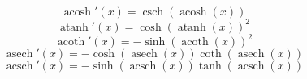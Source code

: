 \documentclass{article}
\DeclareMathOperator{\csch}{csch}
\DeclareMathOperator{\acosh}{acosh}
\DeclareMathOperator{\atanh}{atanh}
\DeclareMathOperator{\acoth}{acoth}
\DeclareMathOperator{\asech}{asech}
\DeclareMathOperator{\acsch}{acsch}
\begin{document}
    \begin{equation}
        \acosh'(x)=\csch(\acosh(x))
    \end{equation}
    \begin{equation}
        \atanh'(x)=\cosh(\atanh(x))^2
    \end{equation}
    \begin{equation}
        \acoth'(x)=-\sinh(\acoth(x))^2
    \end{equation}
    \begin{equation}
        \asech'(x)=-\cosh(\asech(x))\coth(\asech(x))
    \end{equation}
    \begin{equation}
        \acsch'(x)=-\sinh(\acsch(x))\tanh(\acsch(x))
    \end{equation}
\end{document}
